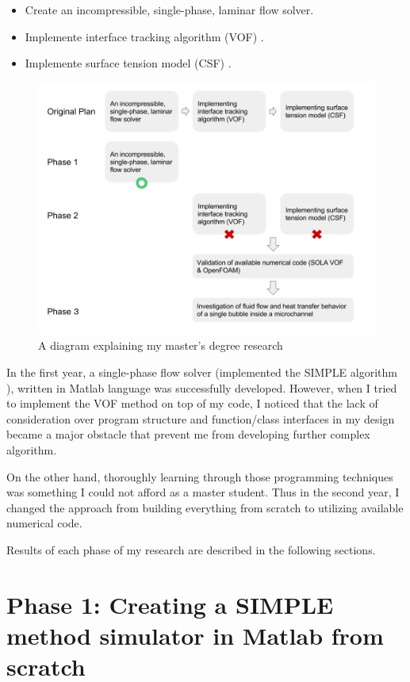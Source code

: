 \documentclass[a4,14pt]{extarticle}
\begin{document}
\begin{itemize}
\item{Create an incompressible, single-phase, laminar flow solver.}
\item{Implemente interface tracking algorithm (VOF) \cite{Hirt1981201}.}
\item{Implemente surface tension model (CSF) \cite{Brackbill1992335}.}
\end{itemize}

\begin{figure}[h!]
  \centering
  \includegraphics[width=15cm]{master_plan.png}
  \caption{A diagram explaining my master's degree research}
  \label{fig:master_plan}
\end{figure}

In the first year, a single-phase flow solver (implemented the
SIMPLE algorithm \cite{patankar1980numerical}), written in Matlab language was successfully developed.
However, when I tried
to implement the VOF method on top of my code, I noticed that the lack of
consideration over program structure and function/class interfaces in my design became a major obstacle
that prevent me from developing further complex algorithm.

On the other hand, thoroughly learning through those programming techniques was something I could not
afford as a master student. Thus in the second year, I changed the approach from building
everything from scratch to utilizing available numerical code.

Results of each phase of my research are described in the following sections.

\section{Phase 1: Creating a SIMPLE method simulator in Matlab from scratch}
\end{document}
